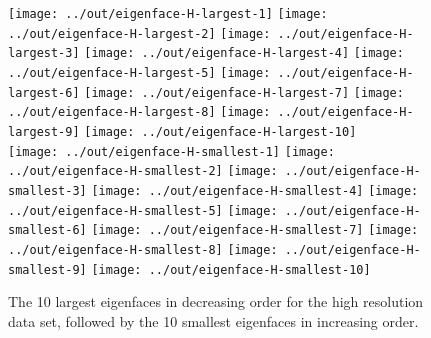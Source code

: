 \documentclass[headings=optiontoheadandtoc,listof=totoc,parskip=full]{scrartcl}
\begin{document}
\begin{figure}[H]
	\centering
	\texttt{[image: ../out/eigenface-H-largest-1]}
	\texttt{[image: ../out/eigenface-H-largest-2]}
	\texttt{[image: ../out/eigenface-H-largest-3]}
	\texttt{[image: ../out/eigenface-H-largest-4]}
	\texttt{[image: ../out/eigenface-H-largest-5]}
	\texttt{[image: ../out/eigenface-H-largest-6]}
	\texttt{[image: ../out/eigenface-H-largest-7]}
	\texttt{[image: ../out/eigenface-H-largest-8]}
	\texttt{[image: ../out/eigenface-H-largest-9]}
	\texttt{[image: ../out/eigenface-H-largest-10]}\\
	\texttt{[image: ../out/eigenface-H-smallest-1]}
	\texttt{[image: ../out/eigenface-H-smallest-2]}
	\texttt{[image: ../out/eigenface-H-smallest-3]}
	\texttt{[image: ../out/eigenface-H-smallest-4]}
	\texttt{[image: ../out/eigenface-H-smallest-5]}
	\texttt{[image: ../out/eigenface-H-smallest-6]}
	\texttt{[image: ../out/eigenface-H-smallest-7]}
	\texttt{[image: ../out/eigenface-H-smallest-8]}
	\texttt{[image: ../out/eigenface-H-smallest-9]}
	\texttt{[image: ../out/eigenface-H-smallest-10]}
	\caption{The 10 largest eigenfaces in decreasing order for the high resolution data set, followed by the 10 smallest eigenfaces in increasing order.}
	\label{fig:largest-eigen-high-res}
\end{figure}
\end{document}
